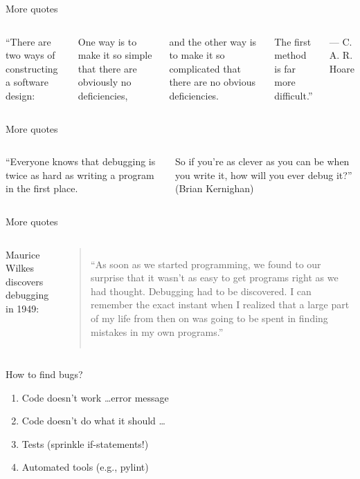 \documentclass[aspectratio=169,usenames,dvipsnames]{beamer}
\begin{document}
\begin{frame}{More quotes}
    \begin{columns}
``There are two ways of constructing a software design:

One way is to make it so simple that there are obviously no deficiencies,

and the other way is to make it so complicated that there are no obvious deficiencies.

The first method is far more difficult.''

--- C. A. R. Hoare 
    \end{columns}
\end{frame}

\begin{frame}{More quotes}
    \begin{columns}
    ``Everyone knows that debugging is twice as hard as writing a program in
    the first place.

	So if you're as clever as you can be when you write it,
    how will you ever debug it?'' (Brian Kernighan)
    \end{columns}
\end{frame}

\begin{frame}{More quotes}
    \begin{columns}
    Maurice Wilkes discovers debugging in 1949:

    \vspace{1em}
    \begin{quote}\normalfont
    ``As soon as we started programming, we found to our surprise that it
    wasn't as easy to get programs right as we had thought. Debugging had to be
    discovered. I can remember the exact instant when I realized that a large
    part of my life from then on was going to be spent in finding mistakes in
    my own programs.''
    \end{quote}
    \end{columns}
\end{frame}

\begin{frame}{How to find bugs?}
	\begin{enumerate}
		\item Code doesn't work \dots error message
		\item Code doesn't do what it should \dots
		\item Tests (sprinkle if-statements!)
		\item Automated tools (e.g., pylint)
	\end{enumerate}
\end{frame}
\end{document}
